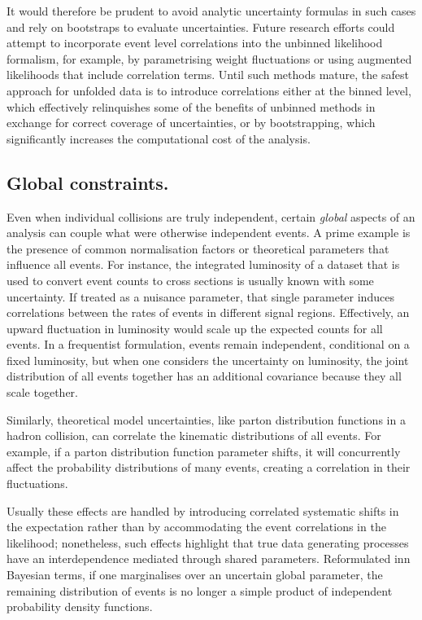         It would therefore be prudent to avoid analytic uncertainty formulas in such cases and rely on bootstraps to evaluate uncertainties.
        Future research efforts could attempt to incorporate event level correlations into the unbinned likelihood formalism, for example, by parametrising weight fluctuations or using augmented likelihoods that include correlation terms.
        Until such methods mature, the safest approach for unfolded data is to introduce correlations either at the binned level, which effectively relinquishes some of the benefits of unbinned methods in exchange for correct coverage of uncertainties, or by bootstrapping, which significantly increases the computational cost of the analysis.

    \subsection{Global constraints.}
    
        Even when individual collisions are truly independent, certain \emph{global} aspects of an analysis can couple what were otherwise independent events.
        A prime example is the presence of common normalisation factors or theoretical parameters that influence all events.
        For instance, the integrated luminosity of a dataset that is used to convert event counts to cross sections is usually known with some uncertainty.
        If treated as a nuisance parameter, that single parameter induces correlations between the rates of events in different signal regions.
        Effectively, an upward fluctuation in luminosity would scale up the expected counts for all events.
        In a frequentist formulation, events remain independent, conditional on a fixed luminosity, but when one considers the uncertainty on luminosity, the joint distribution of all events together has an additional covariance because they all scale together.
        
        Similarly, theoretical model uncertainties, like parton distribution functions in a hadron collision, can correlate the kinematic distributions of all events.
        For example, if a parton distribution function parameter shifts, it will concurrently affect the probability distributions of many events, creating a correlation in their fluctuations.
        
        Usually these effects are handled by introducing correlated systematic shifts in the expectation rather than by accommodating the event correlations in the likelihood;
        nonetheless, such effects highlight that true data generating processes have an interdependence mediated through shared parameters.
        Reformulated inn Bayesian terms, if one marginalises over an uncertain global parameter, the remaining distribution of events is no longer a simple product of independent probability density functions.
        

